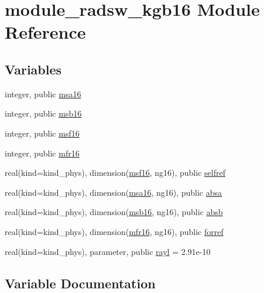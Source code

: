 \hypertarget{namespacemodule__radsw__kgb16}{}\section{module\+\_\+radsw\+\_\+kgb16 Module Reference}
\label{namespacemodule__radsw__kgb16}
\subsection*{Variables}
\begin{DoxyCompactItemize}
\item 
integer, public \hyperlink{namespacemodule__radsw__kgb16_ad76a9d79e77228ac93ec3db96eed2b29}{msa16}
\item 
integer, public \hyperlink{group__module__radsw__main_ga2ce1ab36897fb1fc7d85cbf7fe539e59}{msb16}
\item 
integer, public \hyperlink{group__module__radsw__main_gab35df3f7d231e98fbef5738119138907}{msf16}
\item 
integer, public \hyperlink{group__module__radsw__main_gaeee3fe8e44f6fbd9a6a008bc9f97f37c}{mfr16}
\item 
real(kind=kind\+\_\+phys), dimension(\hyperlink{group__module__radsw__main_gab35df3f7d231e98fbef5738119138907}{msf16}, ng16), public \hyperlink{group__module__radsw__main_ga77d98f3fb766d4abfd494332ce67c2c2}{selfref}
\item 
real(kind=kind\+\_\+phys), dimension(\hyperlink{namespacemodule__radsw__kgb16_ad76a9d79e77228ac93ec3db96eed2b29}{msa16}, ng16), public \hyperlink{group__module__radsw__main_ga51fe40b5f24cc461850fe5be40d18869}{absa}
\item 
real(kind=kind\+\_\+phys), dimension(\hyperlink{group__module__radsw__main_ga2ce1ab36897fb1fc7d85cbf7fe539e59}{msb16}, ng16), public \hyperlink{group__module__radsw__main_gafe8639128e4f7a48f133b7399addcb79}{absb}
\item 
real(kind=kind\+\_\+phys), dimension(\hyperlink{group__module__radsw__main_gaeee3fe8e44f6fbd9a6a008bc9f97f37c}{mfr16}, ng16), public \hyperlink{group__module__radsw__main_ga8e8cf110f56c7d4253c63bbf607be34c}{forref}
\item 
real(kind=kind\+\_\+phys), parameter, public \hyperlink{group__module__radsw__main_ga27964e0300eb686acf1ed3c8459d3810}{rayl} = 2.\+91e-\/10
\end{DoxyCompactItemize}


\subsection{Variable Documentation}
